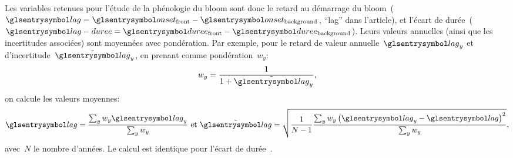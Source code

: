 Les variables retenues pour l'étude de la phénologie du bloom sont donc le retard au démarrage du bloom~(\(\am{lag} = \am{onset}_\frt - \am{onset}_\bkg \), \enquote{lag} dans l'article), et l'écart de durée~(\(\am{lag-duree} = \am{duree}_\frt - \am{duree}_\bkg\)).
Leurs valeurs annuelles (ainsi que les incertitudes associées) sont moyennées avec pondération.
Par exemple, pour le retard de valeur annuelle~\(\am{lag}_y\) et d'incertitude~\(\err{\am{lag}}_y\), en prenant comme pondération~\(w_y\):
\begin{equation}
  w_y = \frac 1 {1 + \err{\am{lag}}_y} ,
\end{equation}
on calcule les valeurs moyennes:
\begin{equation}
  \am{lag} = \frac {\sum_y w_y \am{lag}_y} {\sum_y w_y}
  \text{ et }
  \err{\am{lag}} = \sqrt{ \frac1{N-1} \frac {\sum_y w_y \paren{\am{lag}_y - \am{lag}}^2 } {\sum_y w_y} },
\end{equation}
avec~\(N\) le nombre d'années.
Le calcul est identique pour l'écart de durée~.
